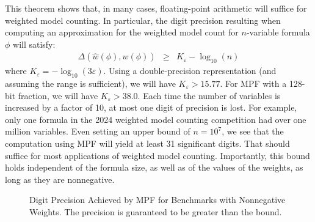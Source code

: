 \documentclass[letterpaper,USenglish,cleveref, autoref, thm-restate]{lipics-v2021}
\newcommand{\approximate}[1]{\hat{#1}}
\newcommand{\approxw}{\approximate{w}}
\newcommand{\digitprecision}{\Delta}
\newcommand{\roundepsilon}{\varepsilon}
\begin{document}
This theorem shows that, in many cases, floating-point arithmetic will suffice for weighted model counting.  In particular, the digit precision
resulting when computing an approximation for the weighted model count for $n$-variable formula $\phi$ will satisfy:
\begin{eqnarray}
\digitprecision(\approxw(\phi), w(\phi)) & \geq & K_{\roundepsilon} - \log_{10}(n) \label{eqn:precision:wmc}
\end{eqnarray}
where $K_{\roundepsilon} = -\log_{10}(3\roundepsilon)$.  Using a
double-precision representation (and assuming the range is
sufficient), we will have $K_{\roundepsilon} > 15.77$.  For MPF with a
128-bit fraction, we will have $K_{\roundepsilon} > 38.0$.  Each time
the number of variables is increased by a factor of 10, at most one
digit of precision is lost.  For example, only one formula in the 2024
weighted model counting competition had over one million variables.
Even setting an upper bound of $n = 10^7$, we see that the computation using
MPF will yield at least 31 significant digits.  That should suffice for most applications of weighted model counting.
Importantly, this bound holds independent of the formula size, as well as of the values of the weights, as long as they are nonnegative.

\begin{figure}
\caption{Digit Precision Achieved by MPF for Benchmarks with Nonnegative Weights.  The precision is guaranteed to be greater than the bound.}
\label{fig:pos:mpf}
\end{figure}
\end{document}
